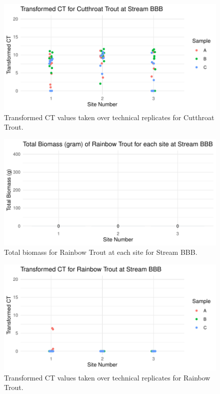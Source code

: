 \begin{figure}[H]
\centering
\includegraphics{AppendixImages/BBB_ct_tct.pdf}
\caption{  \hspace{1mm}  Transformed CT values taken over technical replicates for Cutthroat Trout.}
\label{fig:BBB_ct}
\end{figure}




\begin{figure}[H]
\centering
\includegraphics{AppendixImages/BBB_Rb_new.pdf}
\caption{  \hspace{1mm}  Total biomass for Rainbow Trout at each site for Stream BBB.}
\label{fig:testBBBbiomRb}
\end{figure}




\begin{figure}[H]
\centering
\includegraphics{AppendixImages/BBB_rb_tct.pdf}
\caption{ \hspace{1mm}  Transformed CT values taken over technical replicates for Rainbow Trout.}
\label{fig:BBB_rb}
\end{figure}







